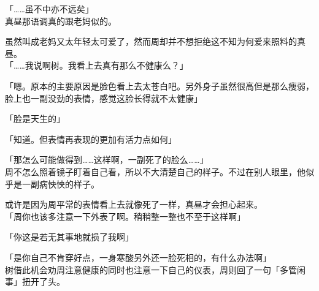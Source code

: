 「……虽不中亦不远矣」\\

真昼那语调真的跟老妈似的。

虽然叫成老妈又太年轻太可爱了，然而周却并不想拒绝这不知为何爱来照料的真昼。\\

「……我说啊树。我看上去真有那么不健康么？」

「嗯。原本的主要原因是脸色看上去太苍白吧。另外身子虽然很高但是那么瘦弱，脸上也一副没劲的表情，感觉这脸长得就不太健康」

「脸是天生的」

「知道。但表情再表现的更加有活力点如何」

「那怎么可能做得到……这样啊，一副死了的脸么……」\\

周不怎么照着镜子盯着自己看，所以不大清楚自己的样子。不过在别人眼里，他似乎是一副病怏怏的样子。

或许是因为周平常的表情看上去就像死了一样，真昼才会担心起来。\\

「周你也该多注意一下外表了啊。稍稍整一整也不至于这样啊」

「你这是若无其事地就损了我啊」

「是你自己不肯穿好点，一身寒酸另外还一脸死相的，有什么办法啊」\\

树借此机会劝周注意健康的同时也注意一下自己的仪表，周则回了一句「多管闲事」扭开了头。
